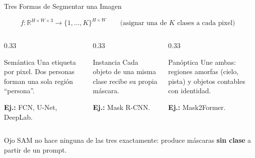 \documentclass[aspectratio=169, 10pt]{beamer}
\providecommand{\R}{\mathbb{R}}
\newcommand{\formula}[1]{%
	\begin{tcolorbox}[colback=UCMBlue!8, colframe=UCMBlue, arc=4pt,
		boxsep=2pt, left=6pt, right=6pt, top=3pt, bottom=3pt]
		#1
	\end{tcolorbox}
}
\begin{document}
\begin{frame}{Tres Formas de Segmentar una Imagen}

	\formula{
		\[
		f : \R^{H \times W \times 3} \to \{1, \dots, K\}^{H \times W}
		\qquad \text{(asignar una de $K$ clases a cada pixel)}
		\]
	}

	\begin{columns}[T]
		\begin{column}{0.33\textwidth}
			\begin{block}{Sem\'antica}
				\small
				Una etiqueta por pixel. Dos personas forman una sola regi\'on ``persona''.

				\textbf{Ej.:} FCN, U-Net, DeepLab.
			\end{block}
		\end{column}

		\begin{column}{0.33\textwidth}
			\begin{block}{Instancia}
				\small
				Cada objeto de una misma clase recibe su propia m\'ascara.

				\textbf{Ej.:} Mask R-CNN.
			\end{block}
		\end{column}

		\begin{column}{0.33\textwidth}
			\begin{block}{Pan\'optica}
				\small
				Une ambas: regiones amorfas (cielo, pista) y objetos contables con identidad.

				\textbf{Ej.:} Mask2Former.
			\end{block}
		\end{column}
	\end{columns}

	\vspace{0.2cm}

	\begin{alertblock}{Ojo}
		SAM no hace ninguna de las tres exactamente: produce m\'ascaras \textbf{sin clase} a partir de un prompt.
	\end{alertblock}

\end{frame}
\end{document}

